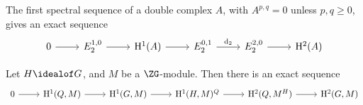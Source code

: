 \documentclass{article}
\begin{document}
\begin{proposition}
    \label{prop:five-term-exact-sequence}

    The first spectral sequence of a double complex \(A\), with \(A^{p, q} = 0\) unless \(p, q \ge 0\), gives an exact sequence
    \[\begin{tikzcd}
        0 & {E_2^{1,0}} & {\HH^1(A)} & {E_2^{0,1}} & {E_2^{2,0}} & {\HH^2(A)}
        \arrow[from=1-1, to=1-2]
        \arrow[from=1-2, to=1-3]
        \arrow[from=1-3, to=1-4]
        \arrow["{\dd_2}", from=1-4, to=1-5]
        \arrow[from=1-5, to=1-6]
    \end{tikzcd}\]
\end{proposition}

\begin{corollary}
    \label{cor:five-term-exact-sequence-group-cohomology}
    Let \(H \idealof G\), and \(M\) be a \(\ZG\)-module. Then there is an exact sequence
    \[\begin{tikzcd}
        0 & {\HH^1(Q,M)} & {\HH^1(G, M)} & {\HH^1(H, M)^Q} & {\HH^2(Q, M^H)} & {\HH^2(G, M)}
        \arrow[from=1-1, to=1-2]
        \arrow[from=1-2, to=1-3]
        \arrow[from=1-3, to=1-4]
        \arrow[from=1-4, to=1-5]
        \arrow[from=1-5, to=1-6]
    \end{tikzcd}\]
\end{corollary}
\end{document}
